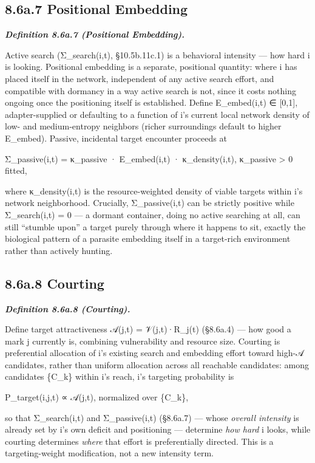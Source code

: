 \documentclass[
]{article}
\begin{document}
\hypertarget{a.7-positional-embedding}{%
\subsection{8.6a.7 Positional
Embedding}\label{a.7-positional-embedding}}

\emph{\textbf{Definition 8.6a.7 (Positional Embedding).}}

Active search (Σ\_search(i,t), §10.5b.11c.1) is a behavioral intensity
--- how hard i is looking. Positional embedding is a separate,
positional quantity: where i has placed itself in the network,
independent of any active search effort, and compatible with dormancy in
a way active search is not, since it costs nothing ongoing once the
positioning itself is established. Define E\_embed(i,t) ∈ {[}0,1{]},
adapter-supplied or defaulting to a function of i's current local
network density of low- and medium-entropy neighbors (richer
surroundings default to higher E\_embed). Passive, incidental target
encounter proceeds at

Σ\_passive(i,t) = κ\_passive · E\_embed(i,t) · κ\_density(i,t),
κ\_passive \textgreater{} 0 fitted,

where κ\_density(i,t) is the resource-weighted density of viable targets
within i's network neighborhood. Crucially, Σ\_passive(i,t) can be
strictly positive while Σ\_search(i,t) = 0 --- a dormant container,
doing no active searching at all, can still ``stumble upon'' a target
purely through where it happens to sit, exactly the biological pattern
of a parasite embedding itself in a target-rich environment rather than
actively hunting.

\hypertarget{a.8-courting}{%
\subsection{8.6a.8 Courting}\label{a.8-courting}}

\emph{\textbf{Definition 8.6a.8 (Courting).}}

Define target attractiveness 𝒜(j,t) = 𝒱(j,t)·R\_j(t) (§8.6a.4) --- how
good a mark j currently is, combining vulnerability and resource size.
Courting is preferential allocation of i's existing search and embedding
effort toward high-𝒜 candidates, rather than uniform allocation across
all reachable candidates: among candidates \{C\_k\} within i's reach,
i's targeting probability is

P\_target(i,j,t) ∝ 𝒜(j,t), normalized over \{C\_k\},

so that Σ\_search(i,t) and Σ\_passive(i,t) (§8.6a.7) --- whose
\emph{overall intensity} is already set by i's own deficit and
positioning --- determine \emph{how hard} i looks, while courting
determines \emph{where} that effort is preferentially directed. This is
a targeting-weight modification, not a new intensity term.
\end{document}
